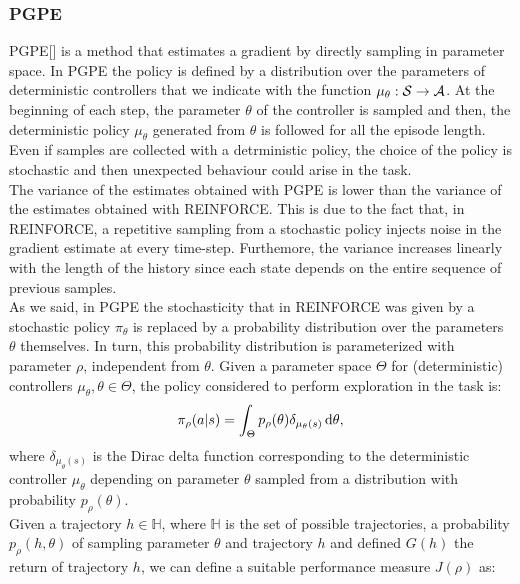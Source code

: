 \subsubsection{\ac{PGPE}} \label{subsec:pgpe}
\acf{PGPE}[\citet{sehnke2008PolicyGradient}] is a method that estimates a gradient by directly sampling in parameter space. In \ac{PGPE} the policy is defined by a distribution over the parameters of deterministic controllers that we indicate with the function $\mu_{\theta}: \mathcal{S} \to \mathcal{A}$. At the beginning of each step, the parameter $\theta$ of the controller is sampled and then, the deterministic policy $\mu_{\theta}$ generated from $\theta$ is followed for all the episode length. Even if samples are collected with a detrministic policy, the choice of the policy is stochastic and then unexpected behaviour could arise in the task.\\
\newline
The variance of the estimates obtained with \ac{PGPE} is lower than the variance of the estimates obtained with REINFORCE. This is due to the fact that, in REINFORCE, a repetitive sampling from a stochastic policy injects noise in the gradient estimate at every time-step. Furthemore, the variance increases linearly with the length of the history since each state depends on the entire sequence of previous samples.\\
\newline
As we said, in \ac{PGPE} the stochasticity that in REINFORCE was given by a stochastic policy $\pi_{\theta}$ is replaced by a probability distribution over the parameters $\theta$ themselves. In turn, this probability distribution is parameterized with parameter $\rho$, independent from $\theta$. Given a parameter space $\Theta$ for (deterministic) controllers $\mu_{\theta}, \theta \in \Theta$, the policy considered to perform exploration in the task is:
\begin{align}
\pi_{\rho}(a|s) = \int_{\Theta} p_{\rho}(\theta) \delta_{\mu_{\theta}(s)}\,\mathrm{d} \theta,
\end{align}
where $\delta_{\mu_{\theta}(s)}$ is the Dirac delta function corresponding to the deterministic controller $\mu_{\theta}$ depending on parameter $\theta$ sampled from a distribution with probability $p_{\rho}(\theta)$.\\
\newline
Given a trajectory $h \in \mathbb{H}$, where $\mathbb{H}$ is the set of possible trajectories, a probability $p_{\rho}(h, \theta)$ of sampling parameter $\theta$ and trajectory $h$ and defined $G(h)$ the return of trajectory $h$, we can define a suitable performance measure $J(\rho)$ as:
